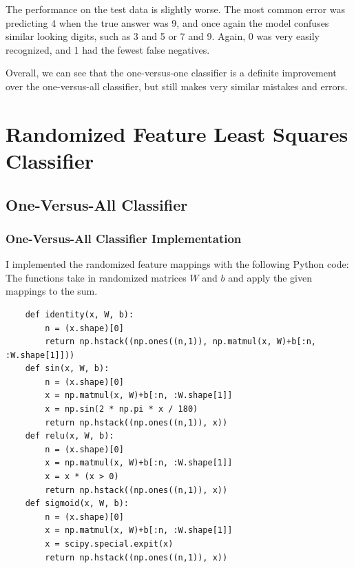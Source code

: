 \documentclass{article}
\begin{document}
The performance on the test data is slightly worse.
The most common error was predicting 4 when the true answer was 9, and once again the model confuses similar looking digits, such as 3 and 5 or 7 and 9.
Again, 0 was very easily recognized, and 1 had the fewest false negatives.

Overall, we can see that the one-versus-one classifier is a definite improvement over the one-versus-all classifier, but still makes very similar mistakes and errors.
\FloatBarrier
\section{Randomized Feature Least Squares Classifier}
\subsection{One-Versus-All Classifier}
\subsubsection{One-Versus-All Classifier Implementation}
I implemented the randomized feature mappings with the following Python code:
The functions take in randomized matrices $W$ and $b$ and apply the given mappings to the sum.
\begin{lstlisting}
    def identity(x, W, b):
        n = (x.shape)[0]
        return np.hstack((np.ones((n,1)), np.matmul(x, W)+b[:n, :W.shape[1]]))
    def sin(x, W, b):
        n = (x.shape)[0]
        x = np.matmul(x, W)+b[:n, :W.shape[1]]
        x = np.sin(2 * np.pi * x / 180)
        return np.hstack((np.ones((n,1)), x))
    def relu(x, W, b):
        n = (x.shape)[0]
        x = np.matmul(x, W)+b[:n, :W.shape[1]]
        x = x * (x > 0)
        return np.hstack((np.ones((n,1)), x))
    def sigmoid(x, W, b):
        n = (x.shape)[0]
        x = np.matmul(x, W)+b[:n, :W.shape[1]]
        x = scipy.special.expit(x)
        return np.hstack((np.ones((n,1)), x))
\end{lstlisting}
\end{document}
